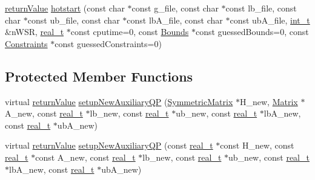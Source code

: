 \begin{DoxyCompactItemize}
\item 
\hyperlink{_message_handling_8hpp_a81d556f613bfbabd0b1f9488c0fa865e}{return\+Value} \hyperlink{class_s_q_problem_a3a16c31de1cfa2253f2651946bdd99e9}{hotstart} (const char $\ast$const g\+\_\+file, const char $\ast$const lb\+\_\+file, const char $\ast$const ub\+\_\+file, const char $\ast$const lb\+A\+\_\+file, const char $\ast$const ub\+A\+\_\+file, \hyperlink{_types_8hpp_ab6fd6105e64ed14a0c9281326f05e623}{int\+\_\+t} \&n\+W\+SR, \hyperlink{qp_o_a_s_e_s__wrapper_8h_a0d00e2b3dfadee81331bbb39068570c4}{real\+\_\+t} $\ast$const cputime=0, const \hyperlink{class_bounds}{Bounds} $\ast$const guessed\+Bounds=0, const \hyperlink{class_constraints}{Constraints} $\ast$const guessed\+Constraints=0)
\end{DoxyCompactItemize}
\subsection*{Protected Member Functions}
\begin{DoxyCompactItemize}
\item 
virtual \hyperlink{_message_handling_8hpp_a81d556f613bfbabd0b1f9488c0fa865e}{return\+Value} \hyperlink{class_s_q_problem_a5a7ba9f2bafb46f3621d830a88447934}{setup\+New\+Auxiliary\+QP} (\hyperlink{class_symmetric_matrix}{Symmetric\+Matrix} $\ast$H\+\_\+new, \hyperlink{class_matrix}{Matrix} $\ast$A\+\_\+new, const \hyperlink{qp_o_a_s_e_s__wrapper_8h_a0d00e2b3dfadee81331bbb39068570c4}{real\+\_\+t} $\ast$lb\+\_\+new, const \hyperlink{qp_o_a_s_e_s__wrapper_8h_a0d00e2b3dfadee81331bbb39068570c4}{real\+\_\+t} $\ast$ub\+\_\+new, const \hyperlink{qp_o_a_s_e_s__wrapper_8h_a0d00e2b3dfadee81331bbb39068570c4}{real\+\_\+t} $\ast$lb\+A\+\_\+new, const \hyperlink{qp_o_a_s_e_s__wrapper_8h_a0d00e2b3dfadee81331bbb39068570c4}{real\+\_\+t} $\ast$ub\+A\+\_\+new)
\item 
virtual \hyperlink{_message_handling_8hpp_a81d556f613bfbabd0b1f9488c0fa865e}{return\+Value} \hyperlink{class_s_q_problem_a3fe2c422b60281e0cfc49316edddebf5}{setup\+New\+Auxiliary\+QP} (const \hyperlink{qp_o_a_s_e_s__wrapper_8h_a0d00e2b3dfadee81331bbb39068570c4}{real\+\_\+t} $\ast$const H\+\_\+new, const \hyperlink{qp_o_a_s_e_s__wrapper_8h_a0d00e2b3dfadee81331bbb39068570c4}{real\+\_\+t} $\ast$const A\+\_\+new, const \hyperlink{qp_o_a_s_e_s__wrapper_8h_a0d00e2b3dfadee81331bbb39068570c4}{real\+\_\+t} $\ast$lb\+\_\+new, const \hyperlink{qp_o_a_s_e_s__wrapper_8h_a0d00e2b3dfadee81331bbb39068570c4}{real\+\_\+t} $\ast$ub\+\_\+new, const \hyperlink{qp_o_a_s_e_s__wrapper_8h_a0d00e2b3dfadee81331bbb39068570c4}{real\+\_\+t} $\ast$lb\+A\+\_\+new, const \hyperlink{qp_o_a_s_e_s__wrapper_8h_a0d00e2b3dfadee81331bbb39068570c4}{real\+\_\+t} $\ast$ub\+A\+\_\+new)
\end{DoxyCompactItemize}
